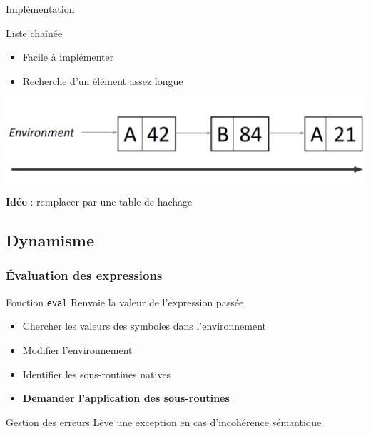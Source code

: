 \documentclass[info]{ensrennesbeamer}
\begin{document}
\begin{frame}{Implémentation}
	\begin{block}{Liste chaînée}
		\begin{itemize}
			\item Facile à implémenter
			\item Recherche d'un élément assez longue		
		\end{itemize}
	\end{block}
	\centering
	\includegraphics[width=1.0\textwidth]{environnement_implementation.png}
	
	\textbf{Idée} : remplacer par une table de hachage
\end{frame}

\subsection{Dynamisme}
\subsubsection{Évaluation des expressions}
\begin{frame}
	\begin{block}{Fonction \lstinline[][eval[}
		Renvoie la valeur de l'expression passée
		\begin{itemize}
			\item Chercher les valeurs des symboles dans l'environnement
			\item Modifier l'environnement
			\item Identifier les sous-routines natives
			\item \textbf{Demander l'application des sous-routines}
		\end{itemize}
	\end{block}
	\begin{alertblock}{Gestion des erreurs}
		Lève une exception en cas d'incohérence sémantique
	\end{alertblock}

\end{frame}
\end{document}
